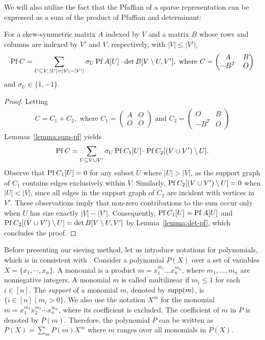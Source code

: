 We will also utilize the fact that the Pfaffian of a sparse representation can be expressed as a sum of the product of Pfaffian and determinant:

\begin{lemma} \label{lemma:pf-det-decomposition}
  For a skew-symmetric matrix $A$ indexed by $V$ and a matrix $B$ whose rows and columns are indexed by $V'$ and $V$, respectively, with $|V| \le |V'|$,
  \begin{align*}
    \operatorname{Pf} C = \sum_{U \subseteq V,\, |U| = |V| - |V'|} \sigma_{U} \operatorname{Pf} A[U] \cdot \det B[V \setminus U, V'], 
    \text{ where }
    C = \begin{pmatrix}
      A & B \\ -B^T & O
    \end{pmatrix}
  \end{align*}
  and $\sigma_{U} \in \{ 1, -1 \}$.
\end{lemma}
\begin{proof}
  Letting
  \begin{align*}
    C = C_1 + C_2, \text{ where }
    C_1 = \begin{pmatrix} A & O \\ O & O \end{pmatrix}  \text{ and }
    C_2 = \begin{pmatrix} O & B \\ -B^T & O \end{pmatrix}
  \end{align*}
  Lemmas~\ref{lemma:sum-pf} yields
  \begin{align*}
    \operatorname{Pf} C = \sum_{U \subseteq V \cup V'} \sigma_U \operatorname{Pf} C_1[U] \cdot \operatorname{Pf} C_2[(V \cup V') \setminus U].
  \end{align*}
  Observe that $\operatorname{Pf} C_1[U] = 0$ for any subset $U$ where $|U| > |V|$, as the support graph of $C_1$ contains edges exclusively within $V$.
  Similarly, $\operatorname{Pf} C_2[(V \cup V') \setminus U] = 0$ when $|U| < |V|$, since all edges in the support graph of $C_2$ are incident with vertices in $V'$.
  These observations imply that non-zero contributions to the sum occur only when $U$ has size exactly $|V| - |V'|$.
  Consequently, $\operatorname{Pf} C_1[U] = \operatorname{Pf} A[U]$ and $\operatorname{Pf} C_2 [(V \cup V') \setminus U] = \det B[V \setminus U, V']$ by Lemma~\ref{lemma:det-pf}, which concludes the proof.
\end{proof}

Before presenting our sieving method, let us introduce notations for polynomials, which is in consistent with \cite{EKW23}.
Consider a polynomial $P(X)$ over a set of variables $X = \{ x_1, \cdots, x_n \}$.
A monomial is a product $m = x_1^{m_1} \dots x_n^{m_n}$, where $m_1, \dots, m_n$ are nonnegative integers.
A monomial $m$ is called multilinear if $m_i \le 1$ for each $i \in [n]$.
The \emph{support} of a monomial $m$, denoted by $\operatorname{supp}(m)$, is $\{ i \in [n] \mid m_i
> 0 \}$. 
We also use the notation $X^m$ for the monomial $m=x_1^{m_1} x_2^{m_2} \cdots x_n^{m_n}$,
where its coefficient is excluded.
The coefficient of $m$ in $P$ is denoted by $P(m)$.
Therefore, the polynomial $P$ can be written as $P(X)=\sum_m P(m) X^m$
where $m$ ranges over all monomials in $P(X)$.

